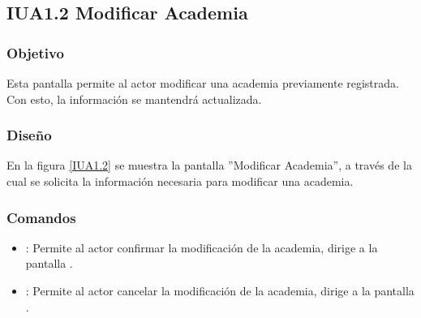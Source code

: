 \subsection{IUA1.2 Modificar Academia}

\subsubsection{Objetivo}
	Esta pantalla permite al actor modificar una academia previamente registrada. Con esto, la información se mantendrá actualizada.

\subsubsection{Diseño}

	En la figura \ref{IUA1.2} se muestra la pantalla ''Modificar Academia'', a través de la cual se solicita la información necesaria para modificar una academia.


\subsubsection{Comandos}
\begin{itemize}
	\item {}: Permite al actor confirmar la modificación de la academia, dirige a la pantalla .
	
	\item {}: Permite al actor cancelar la modificación de la academia, dirige a la pantalla .
\end{itemize}
